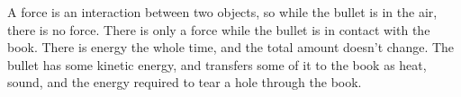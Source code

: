 A force is an interaction between two objects, so while
the bullet is in the air, there is no force. There is only a
force while the bullet is in contact with the book. There is
energy the whole time, and the total amount doesn't change.
The bullet has some kinetic energy, and transfers some of it
to the book as heat, sound, and the energy required to tear
a hole through the book.



